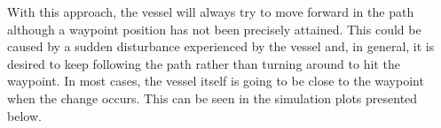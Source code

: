 With this approach, the vessel will always try to move forward in the path although a waypoint position has not been precisely attained. %
This could be caused by a sudden disturbance experienced by the vessel and, in general, it is desired to keep following the path rather than turning around to hit the waypoint. In most cases, the vessel itself is going to be close to the waypoint when the change occurs. This can be seen in the simulation plots presented below. 

	



